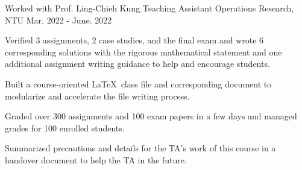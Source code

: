 \begin{cventries}

    \cventry
    {Worked with Prof. Ling-Chieh Kung}
    {Teaching Assistant} %
    {Operations Research, NTU} %
    {Mar. 2022 - June. 2022} %
    {
      \begin{cvitems} %
        \item {Verified 3 assignments, 2 case studies, and the final exam
            and wrote 6 corresponding solutions with the rigorous mathematical
            statement and one additional
            assignment writing guidance to help and encourage students.}
        \item Built a course-oriented \LaTeX\ class file and corresponding
            document to modularize and accelerate the file 
            writing process.
        \item Graded over 300 assignments and 100 exam papers in a few days
            and managed grades for 100 enrolled students.
        \item Summarized precautions and details for the TA's work of
            this course in a handover document to help the TA in the future.
      \end{cvitems}
    }





\end{cventries}
